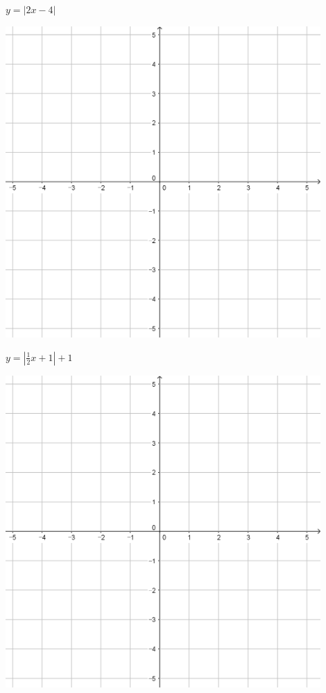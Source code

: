 \documentclass{oblivoir}
\begin{document}
\begin{minipage}{0.45\textwidth}\centering
\(y=|2x-4|\)
\par\bigskip\includegraphics[width=0.9\textwidth]{55}
\end{minipage}
\begin{minipage}{0.45\textwidth}\centering
\(y=|\frac12x+1|+1\)
\par\bigskip\includegraphics[width=0.9\textwidth]{55}
\end{minipage}\bigskip\bigskip\par
\end{document}
